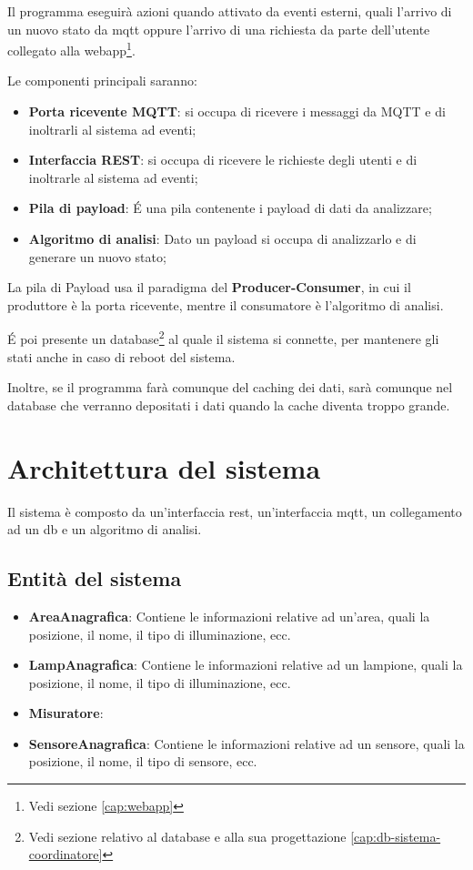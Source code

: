Il programma eseguirà azioni quando attivato da eventi esterni, quali l'arrivo di un nuovo stato da mqtt oppure l'arrivo di una richiesta da parte dell'utente collegato alla webapp\footnote{Vedi sezione \ref{cap:webapp}}.

Le componenti principali saranno:

\begin{itemize}
    \item \textbf{Porta ricevente MQTT}: si occupa di ricevere i messaggi da MQTT e di inoltrarli al sistema ad eventi;
    \item \textbf{Interfaccia REST}: si occupa di ricevere le richieste degli utenti e di inoltrarle al sistema ad eventi;
    \item \textbf{Pila di payload}: É una pila contenente i payload di dati da analizzare;
    \item \textbf{Algoritmo di analisi}: Dato un payload si occupa di analizzarlo e di generare un nuovo stato;
\end{itemize}

La pila di Payload usa il paradigma del \textbf{Producer-Consumer}, in cui il produttore è la porta ricevente, mentre il consumatore è l'algoritmo di analisi.

É poi presente un database\footnote{Vedi sezione relativo al database e alla sua progettazione \ref{cap:db-sistema-coordinatore}} al quale il sistema si connette, per mantenere gli stati anche in caso di reboot del sistema.

Inoltre, se il programma farà comunque del caching dei dati, sarà comunque nel database che verranno depositati i dati quando la cache diventa troppo grande.

\section{Architettura del sistema}

Il sistema è composto da un'interfaccia rest, un'interfaccia mqtt, un collegamento ad un db e un algoritmo di analisi.

\subsection{Entità del sistema}

\begin{itemize}
    \item \textbf{AreaAnagrafica}: Contiene le informazioni relative ad un'area, quali la posizione, il nome, il tipo di illuminazione, ecc.
    \item \textbf{LampAnagrafica}: Contiene le informazioni relative ad un lampione, quali la posizione, il nome, il tipo di illuminazione, ecc.
    \item \textbf{Misuratore}:
    \item \textbf{SensoreAnagrafica}: Contiene le informazioni relative ad un sensore, quali la posizione, il nome, il tipo di sensore, ecc.
\end{itemize}

